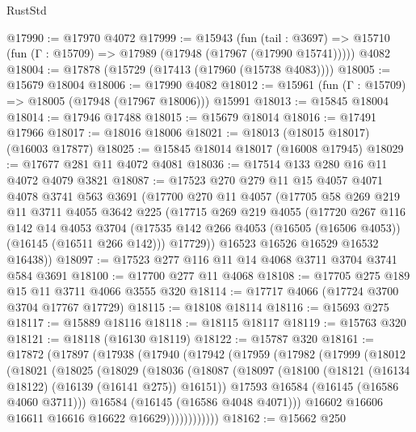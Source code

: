 \begin{lexlean}{RustStd}
\begin{coremodule}
@17990 := @17970 @4072
@17999 := @15943
    (fun (tail : @3697) => @15710 (fun (Γ : @15709) => @17989 (@17948 (@17967 (@17990 @15741)))))
    @4082
@18004 := @17878 (@15729 (@17413 (@17960 (@15738 @4083))))
@18005 := @15679 @18004
@18006 := @17990 @4082
@18012 := @15961 (fun (Γ : @15709) => @18005 (@17948 (@17967 @18006))) @15991
@18013 := @15845 @18004
@18014 := @17946 @17488
@18015 := @15679 @18014
@18016 := @17491 @17966
@18017 := @18016 @18006
@18021 := @18013 (@18015 @18017) (@16003 @17877)
@18025 := @15845 @18014 @18017 (@16008 @17945)
@18029 := @17677 @281 @11 @4072 @4081
@18036 := @17514 @133 @280 @16 @11 @4072 @4079 @3821
@18087 := @17523
    @270
    @279
    @11
    @15
    @4057
    @4071
    @4078
    @3741
    @563
    @3691
    (@17700
      @270
      @11
      @4057
      (@17705
        @58
        @269
        @219
        @11
        @3711
        @4055
        @3642
        @225
        (@17715
          @269
          @219
          @4055
          (@17720
            @267
            @116
            @142
            @14
            @4053
            @3704
            (@17535 @142 @266 @4053 (@16505 (@16506 @4053)) (@16145 (@16511 @266 @142)))
            @17729))
        @16523
        @16526
        @16529
        @16532
        @16438))
@18097 := @17523 @277 @116 @11 @14 @4068 @3711 @3704 @3741 @584 @3691
@18100 := @17700 @277 @11 @4068
@18108 := @17705 @275 @189 @15 @11 @3711 @4066 @3555 @320
@18114 := @17717 @4066 (@17724 @3700 @3704 @17767 @17729)
@18115 := @18108 @18114
@18116 := @15693 @275
@18117 := @15889 @18116
@18118 := @18115 @18117
@18119 := @15763 @320
@18121 := @18118 (@16130 @18119)
@18122 := @15787 @320
@18161 := @17872
    (@17897
      (@17938
        (@17940
          (@17942
            (@17959
              (@17982
                (@17999
                  (@18012
                    (@18021
                      (@18025
                        (@18029
                          (@18036
                            (@18087
                              (@18097
                                (@18100 (@18121 (@16134 @18122) (@16139 (@16141 @275)) @16151))
                                @17593
                                @16584
                                (@16145 (@16586 @4060 @3711)))
                              @16584
                              (@16145 (@16586 @4048 @4071)))
                            @16602
                            @16606
                            @16611
                            @16616
                            @16622
                            @16629))))))))))))
@18162 := @15662 @250

\end{coremodule}
\end{lexlean}
